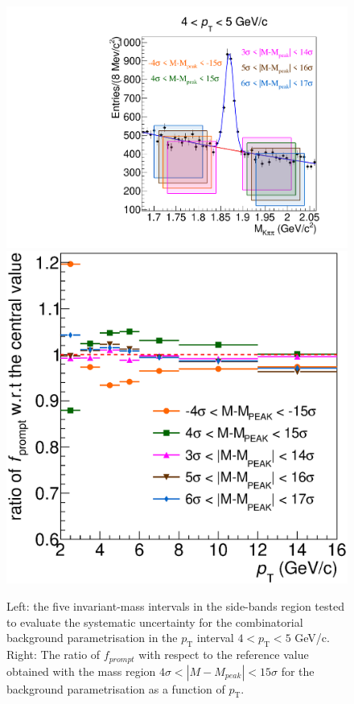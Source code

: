 \documentclass[b5paper,10pt,twoside,oldstyle,classica]{toptesi}
\newcommand{\pt}{p_\text{T}}
\begin{document}
\begin{figure}[tb]
\begin{center}
{\includegraphics[scale = 0.32]{Mass_4-5_SBranges.pdf}}
\hspace{-0.6cm}
{\includegraphics[scale = 0.32]{promptfraction_syst_SBtot_ratioonly.eps}}
\caption{Left: the five invariant-mass intervals in the side-bands region tested to evaluate the systematic uncertainty for the combinatorial background parametrisation in the $\pt$ interval $4<\pt<5$ GeV/c. Right: The ratio of $f_{prompt}$ with respect to the reference value obtained with the mass region $4\sigma< |M-M_{peak}| < 15\sigma$ for the background parametrisation as a function of $\pt$.}

\end{center}
\end{figure}
\end{document}
